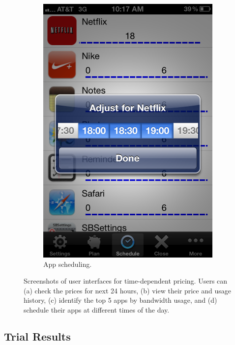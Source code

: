 \begin{figure}[t]
\begin{center}
\begin{subfigure}[b]{0.22\textwidth}
	\includegraphics[width=\textwidth]{Figures/iphone_ui5.pdf}
	\caption{App scheduling.}
\end{subfigure}
\end{center}
\vspace{-0.25in}
\caption{Screenshots of user interfaces for time-dependent pricing. Users can (a) check the prices for next 24 hours, (b) view their price and usage history, (c) identify the top 5 apps by bandwidth usage, and (d) schedule their apps at different times of the day.}
\label{fig:tube_gui}
\vspace{-0.05in}
\end{figure}

\subsection{Trial Results}

